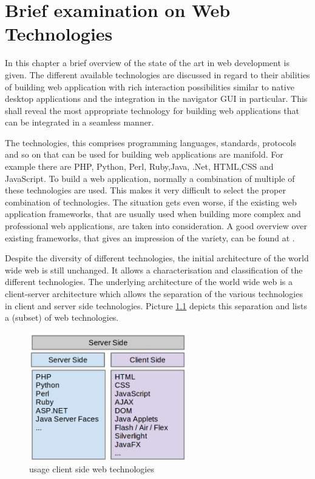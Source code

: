 \chapter{Brief examination on Web Technologies}\label{chap:web_dev}

In this chapter a brief overview of the state of the art in web development is given.
The different available technologies are discussed in regard to their abilities of building web application with rich interaction possibilities similar to native desktop applications and the integration in the navigator GUI in particular.
This shall reveal the most appropriate technology for building web applications that can be integrated in a seamless manner.

The technologies, this comprises programming languages, standards, protocols and so on that can be used for building web applications are manifold.
For example there are PHP, Python, Perl, Ruby,Java, .Net, HTML,CSS and JavaScript.
To build a web application, normally a combination of multiple of these technologies are used.
This makes it very difficult to select the proper combination of technologies.
The situation gets even worse, if the existing web application frameworks, that are usually used when building more complex and professional web applications, are taken into consideration.
A good overview over existing frameworks, that gives an impression of the variety, can be found at \autocite{web-dev:list-frameworks}.

Despite the diversity of different technologies, the initial architecture of the world wide web is still unchanged.
It allows a characterisation and classification of the different technologies.
The underlying architecture of the world wide web is a client-server architecture which allows the separation of the various technologies in client and server side technologies.
Picture \ref{fig:web-technologies} depicts this separation and lists a (subset) of web technologies.

\begin{figure}
	\centering \includegraphics[width=0.61\textwidth]{./img/web-dev/web_technologies.png}
	\caption{usage client side web technologies}
	\label{fig:web-technologies}
\end{figure}

